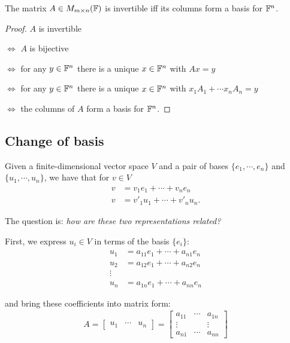\begin{theorem}
  The matrix $A\in M_{m\times n}(\mathbb{F})$ is invertible iff its columns form a basis for $\mathbb{F}^n$.
\end{theorem}
\begin{proof}
  $A$ is invertible

  $\Leftrightarrow$ $A$ is bijective

  $\Leftrightarrow$ for any $y\in\mathbb{F}^n$ there is a unique $x\in\mathbb{F}^n$ with $Ax=y$

  $\Leftrightarrow$ for any $y\in\mathbb{F}^n$ there is a unique $x\in\mathbb{F}^n$ with $x_1A_1 + \cdots x_n A_n = y$

  $\Leftrightarrow$ the columns of $A$ form a basis for $\mathbb{F}^n$.
\end{proof}

\subsection{Change of basis}

Given a finite-dimensional vector space $V$ and a pair of bases $\{e_1,\cdots,e_n\}$ and $\{u_1,\cdots,u_n\}$, we have that for $v\in V$
\begin{align*}
  v &= v_1 e_1 + \cdots + v_n e_n\\
  v &= v'_1 u_1 + \cdots + v'_n u_n.
\end{align*}

The question is: \emph{how are these two representations related?}

First, we express $u_i\in V$ in terms of the basis $\{e_i\}$:
\begin{align*}
  u_1 &= a_{11} e_1 + \cdots + a_{n1} e_n\\
  u_2 &= a_{12} e_1 + \cdots + a_{n2} e_n\\
  \vdots\\
  u_n &=a_{1n} e_1 + \cdots + a_{nn} e_n
\end{align*}

and bring these coefficients into matrix form:
\begin{align*}
A = \begin{bmatrix}
  u_1 & \cdots & u_n
\end{bmatrix} =
\begin{bmatrix}
  a_{11} & \cdots & a_{1n}\\
  \vdots & & \vdots\\
  a_{n1} & \cdots & a_{nn}
\end{bmatrix}
\end{align*}

